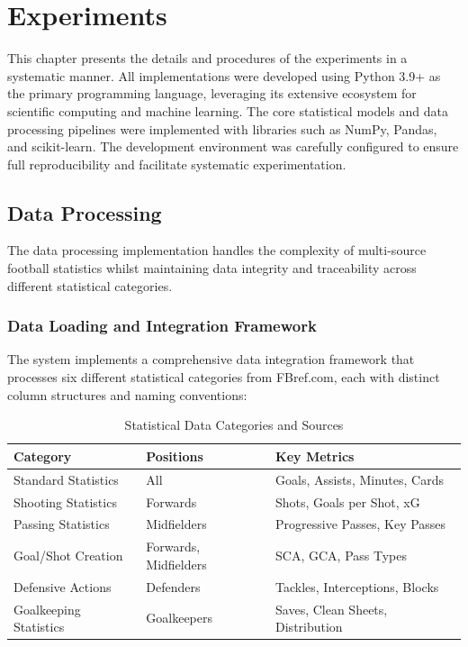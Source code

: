 \section{Experiments}

This chapter presents the details and procedures of the experiments in a systematic manner. All implementations were developed using Python 3.9+ as the primary programming language, leveraging its extensive ecosystem for scientific computing and machine learning. The core statistical models and data processing pipelines were implemented with libraries such as NumPy, Pandas, and scikit-learn. The development environment was carefully configured to ensure full reproducibility and facilitate systematic experimentation.

\subsection{Data Processing}

The data processing implementation handles the complexity of multi-source football statistics whilst maintaining data integrity and traceability across different statistical categories.

\subsubsection{Data Loading and Integration Framework}

The system implements a comprehensive data integration framework that processes six different statistical categories from FBref.com, each with distinct column structures and naming conventions:

\begin{table}[h]
\centering
\caption{Statistical Data Categories and Sources}
\label{tab:data_categories}
\begin{tabular}{lll}
\toprule
\textbf{Category} & \textbf{Positions} & \textbf{Key Metrics} \\
\midrule
Standard Statistics & All & Goals, Assists, Minutes, Cards \\
Shooting Statistics & Forwards & Shots, Goals per Shot, xG \\
Passing Statistics & Midfielders & Progressive Passes, Key Passes \\
Goal/Shot Creation & Forwards, Midfielders & SCA, GCA, Pass Types \\
Defensive Actions & Defenders & Tackles, Interceptions, Blocks \\
Goalkeeping Statistics & Goalkeepers & Saves, Clean Sheets, Distribution \\
\bottomrule
\end{tabular}
\end{table}

